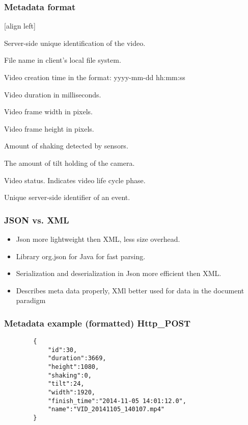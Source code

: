 \begin{frame}
	\frametitle{Metadata format}
	[align left]
	\begin{description}
		\item[id] 
			Server-side unique identification of the video.
		\item[name]
			File name in client's local file system.			
		\item[finish\_time]
			Video creation time in the format: yyyy-mm-dd hh:mm:ss
		\item[duration]
			Video duration in milliseconds.	
		\item[width]
			Video frame width in pixels.
		\item[height]
			Video frame height in pixels.		
		\item[shaking]
			Amount of shaking detected by sensors.
		\item[tilt]
			The amount of tilt holding of the camera.
		\item[status]
			Video status. Indicates video life cycle phase.
		\item[event\_id]
			Unique server-side identifier of an event.		
	\end{description}
\end{frame}

\begin{frame}[fragile]
	\frametitle{JSON vs. XML}
		\begin{itemize}
			\item Json more lightweight then  XML, less size overhead.
			\item Library org.json for Java for fast parsing.
			\item Serialization and deserialization in Json more efficient then XML.
			\item Describes meta data properly, XMl better used for data in the document paradigm
		\end{itemize}
\end{frame}

\begin{frame}[fragile]
	\frametitle{Metadata example (formatted) Http\_POST}
		\begin{verbatim}
		{
		    "id":30,
		    "duration":3669,
		    "height":1080,
		    "shaking":0,
		    "tilt":24,
		    "width":1920,
		    "finish_time":"2014-11-05 14:01:12.0",
		    "name":"VID_20141105_140107.mp4"
		}
		\end{verbatim}
\end{frame}

